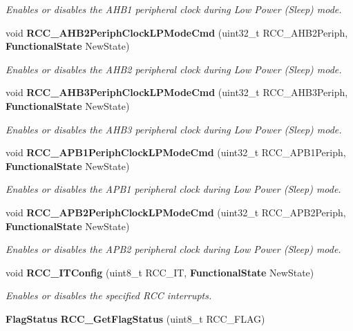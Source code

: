 \begin{DoxyCompactItemize}
\begin{DoxyCompactList}\small\item\em Enables or disables the A\+H\+B1 peripheral clock during Low Power (Sleep) mode. \end{DoxyCompactList}\item 
void \textbf{ R\+C\+C\+\_\+\+A\+H\+B2\+Periph\+Clock\+L\+P\+Mode\+Cmd} (uint32\+\_\+t R\+C\+C\+\_\+\+A\+H\+B2\+Periph, \textbf{ Functional\+State} New\+State)
\begin{DoxyCompactList}\small\item\em Enables or disables the A\+H\+B2 peripheral clock during Low Power (Sleep) mode. \end{DoxyCompactList}\item 
void \textbf{ R\+C\+C\+\_\+\+A\+H\+B3\+Periph\+Clock\+L\+P\+Mode\+Cmd} (uint32\+\_\+t R\+C\+C\+\_\+\+A\+H\+B3\+Periph, \textbf{ Functional\+State} New\+State)
\begin{DoxyCompactList}\small\item\em Enables or disables the A\+H\+B3 peripheral clock during Low Power (Sleep) mode. \end{DoxyCompactList}\item 
void \textbf{ R\+C\+C\+\_\+\+A\+P\+B1\+Periph\+Clock\+L\+P\+Mode\+Cmd} (uint32\+\_\+t R\+C\+C\+\_\+\+A\+P\+B1\+Periph, \textbf{ Functional\+State} New\+State)
\begin{DoxyCompactList}\small\item\em Enables or disables the A\+P\+B1 peripheral clock during Low Power (Sleep) mode. \end{DoxyCompactList}\item 
void \textbf{ R\+C\+C\+\_\+\+A\+P\+B2\+Periph\+Clock\+L\+P\+Mode\+Cmd} (uint32\+\_\+t R\+C\+C\+\_\+\+A\+P\+B2\+Periph, \textbf{ Functional\+State} New\+State)
\begin{DoxyCompactList}\small\item\em Enables or disables the A\+P\+B2 peripheral clock during Low Power (Sleep) mode. \end{DoxyCompactList}\item 
void \textbf{ R\+C\+C\+\_\+\+I\+T\+Config} (uint8\+\_\+t R\+C\+C\+\_\+\+IT, \textbf{ Functional\+State} New\+State)
\begin{DoxyCompactList}\small\item\em Enables or disables the specified R\+CC interrupts. \end{DoxyCompactList}\item 
\textbf{ Flag\+Status} \textbf{ R\+C\+C\+\_\+\+Get\+Flag\+Status} (uint8\+\_\+t R\+C\+C\+\_\+\+F\+L\+AG)

\end{DoxyCompactItemize}
